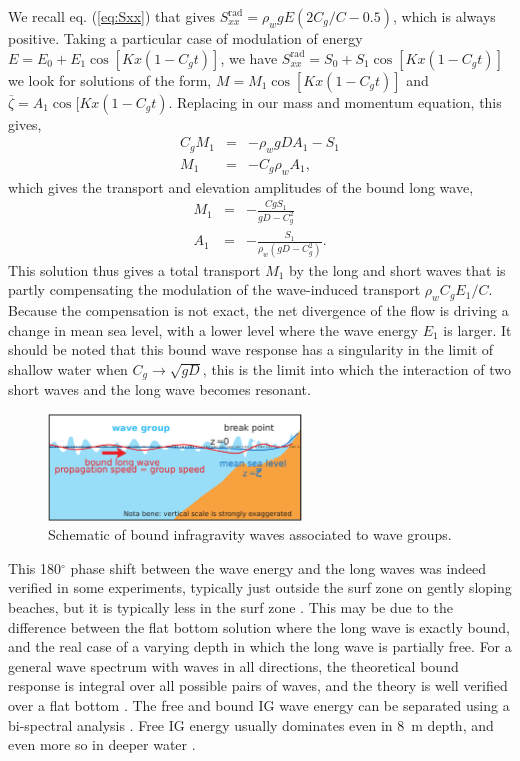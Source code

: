We recall eq. (\ref{eq:Sxx}) that gives $S_{xx}^{\mathrm{rad}}=\rho_w g E (2 C_g/C - 0.5)$, which is always positive. 
Taking a particular case of modulation of energy $E=E_0+ E_1 \cos [K x (1-C_g t)]$, we have
$S_{xx}^{\mathrm{rad}} = S_0 + S_1 \cos [K x (1-C_g t)]$ we look for solutions of the form, $M=M_1  \cos [K x (1-C_g t)]$
and  $\overline{\zeta}=A_1  \cos [K x (1-C_g t)$.  Replacing in our mass and momentum equation, this gives, 
\begin{eqnarray}
C_g M_1 &=& - \rho_w g D A_1 -  S_1 \\
 M_1 &=& - C_g \rho_w  A_1,
\end{eqnarray}
which gives the transport and elevation amplitudes of the bound long wave, 
\begin{eqnarray}
M_1 &=& - \frac{Cg S_1}{gD - C_g^2}\\
 A_1 &=& - \frac{ S_1}{\rho_w (gD - C_g^2)}.
\end{eqnarray}
This solution thus gives a total transport $M_1$ by the long and short waves that is partly compensating 
the modulation of the wave-induced transport $\rho_w C_g E_1/C$. Because the compensation is not exact, the net divergence 
of the flow is driving a change in  mean sea level, with a lower level where the wave energy $E_1$ is larger.
It should be noted that this bound wave response has a singularity in the limit of shallow water when $C_g \rightarrow \sqrt{gD}$, this is 
the limit into which the interaction of two short waves and the long wave becomes resonant. 
\begin{figure}[htb]
\centerline{\includegraphics[width=0.6\textwidth]{FIGS_CH_SURF/Generation_IG_en.pdf}}
  \caption{Schematic of bound infragravity waves associated to wave groups.}
    \label{IGfig}
\end{figure}

This 180$^\circ$ phase shift between the wave energy and the long waves was indeed verified in some experiments, typically just outside the surf zone on 
gently sloping beaches, but it is typically less in the surf zone \citep{Elgar&Guza1985b}. This may be due to the difference between  the flat bottom 
solution where the long wave is exactly bound, and the real case of a varying depth in which the long wave is partially free. For a general wave 
spectrum with waves in all directions, the theoretical bound response is integral over all possible pairs of waves, %
and the theory 
is well verified over a flat bottom \citep{Herbers&al.1994a}. The free and bound IG wave energy can be separated using a bi-spectral analysis  
\citep{Herbers&al.1994a}. Free IG energy usually dominates even in 8~m depth, and even more so in deeper water \citep{Herbers&al.1995}. 

